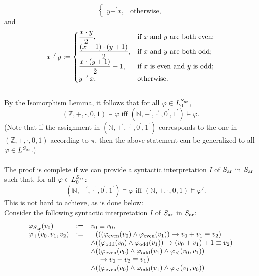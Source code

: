 \begin{enumerate}[1.]
\begin{enumerate}[(a)]
\[\begin{cases}
y +^\prime x, & \mbox{otherwise},
\end{cases}
\]
and
\[
x \cdot^\prime y := \begin{cases}
\displaystyle \frac{x \cdot y}{2}, & \mbox{if \(x\) and \(y\) are both even}; \cr
\displaystyle \frac{(x+1) \cdot (y+1)}{2}, & \mbox{if \(x\) and \(y\) are both odd}; \cr
\displaystyle \frac{x \cdot (y+1)}{2} - 1, & \mbox{if \(x\) is even and \(y\) is odd}; \cr
y \cdot^\prime x, & \mbox{otherwise}.
\end{cases}
\]
\\
By the Isomorphism Lemma, it follows that for all $\varphi \in L_0^{S_{\mbox{\tiny ar}}}$,
\[
\mbox{$(\mathbb{Z}, +, \cdot, 0, 1) \models \varphi$ \  iff \  $(\mathbb{N}, +^\prime, \cdot^\prime, 0^\prime, 1^\prime) \models \varphi$}.
\]
(Note that if the assignment in $(\mathbb{N}, +^\prime, \cdot^\prime, 0^\prime, 1^\prime)$ corresponds to the one in $(\mathbb{Z}, +, \cdot, 0, 1)$ according to $\pi$, then the above statement can be generalized to all $\varphi \in L^{S_{\mbox{\tiny ar}}}$.)\\
\\
The proof is complete if we can provide a syntactic interpretation $I$ of $S_{\mbox{\scriptsize ar}}$ in $S_{\mbox{\scriptsize ar}}$ such that, for all $\varphi \in L_0^{S_{\mbox{\tiny ar}}}$:
\[
\mbox{$\;\;\;$ $(\mathbb{N}, +^\prime, \cdot^\prime, 0^\prime, 1^\prime) \models \varphi$ \  iff \  $(\mathbb{N}, +, \cdot, 0, 1) \models \varphi^I$}.
\]
This is not hard to achieve, as is done below:
\\
Consider the following syntactic interpretation $I$ of $S_{\mbox{\scriptsize ar}}$ in $S_{\mbox{\scriptsize ar}}$:
\[
\begin{array}{lll}
\varphi_{S_{\mbox{\tiny ar}}}(v_0) & := & v_0 \equiv v_0, \\
\varphi_+(v_0, v_1, v_2) & := & \phantom{\land}(((\varphi_{\mbox{\scriptsize even}}(v_0) \land \varphi_{\mbox{\scriptsize even}}(v_1)) \rightarrow v_0 + v_1 \equiv v_2) \\
\  & \  & \land ((\varphi_{\mbox{\scriptsize odd}}(v_0) \land \varphi_{\mbox{\scriptsize odd}}(v_1)) \rightarrow (v_0 + v_1) + 1 \equiv v_2) \\
\  & \  & \land ((\varphi_{\mbox{\scriptsize even}}(v_0) \land \varphi_{\mbox{\scriptsize odd}}(v_1) \land \varphi_< (v_0, v_1)) \\
\  & \  & \phantom{\land(} \rightarrow v_0 + v_2 \equiv v_1) \\
\  & \  & \land ((\varphi_{\mbox{\scriptsize even}}(v_0) \land \varphi_{\mbox{\scriptsize odd}}(v_1) \land \varphi_< (v_1, v_0)) \\

\end{array}\]
\end{enumerate}
\end{enumerate}
